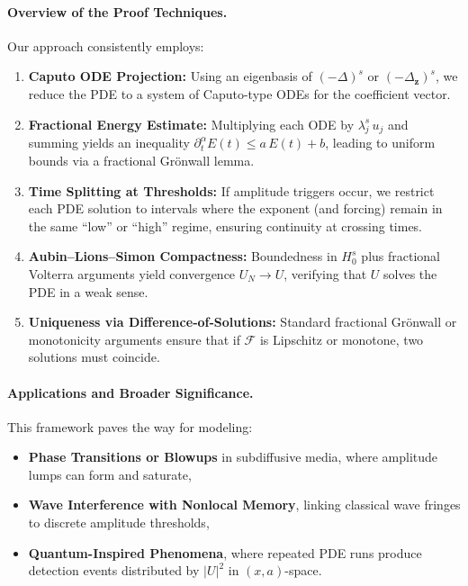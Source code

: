 \documentclass[12pt]{article}
\begin{document}
\paragraph{Overview of the Proof Techniques.}
Our approach consistently employs:
\begin{enumerate}
\item \textbf{Caputo ODE Projection:} Using an eigenbasis of $(-\Delta)^s$ or 
      $(-\Delta_{\mathbf{z}})^s$, we reduce the PDE to a system of Caputo-type ODEs for 
      the coefficient vector. 
\item \textbf{Fractional Energy Estimate:} Multiplying each ODE by $\lambda_j^s\,u_j$ 
      and summing yields an inequality 
      $\partial_t^\alpha E(t)\le a\,E(t)+b$, leading to uniform bounds via a fractional 
      Grönwall lemma.
\item \textbf{Time Splitting at Thresholds:} If amplitude triggers occur, we restrict 
      each PDE solution to intervals where the exponent (and forcing) remain in the 
      same “low” or “high” regime, ensuring continuity at crossing times.
\item \textbf{Aubin--Lions--Simon Compactness:} Boundedness in $H_0^s$ plus fractional 
      Volterra arguments yield convergence $U_N\to U$, verifying that $U$ solves the PDE 
      in a weak sense.
\item \textbf{Uniqueness via Difference‐of‐Solutions:} Standard fractional Grönwall or 
      monotonicity arguments ensure that if $\mathcal{F}$ is Lipschitz or monotone, 
      two solutions must coincide.
\end{enumerate}

\paragraph{Applications and Broader Significance.}
This framework paves the way for modeling:
\begin{itemize}
  \item \textbf{Phase Transitions or Blowups} in subdiffusive media, where amplitude 
        lumps can form and saturate,
  \item \textbf{Wave Interference with Nonlocal Memory}, linking classical wave fringes 
        to discrete amplitude thresholds,
  \item \textbf{Quantum-Inspired Phenomena}, where repeated PDE runs produce detection 
        events distributed by $\lvert U\rvert^2$ in $(x,a)$-space.
\end{itemize}
\end{document}
